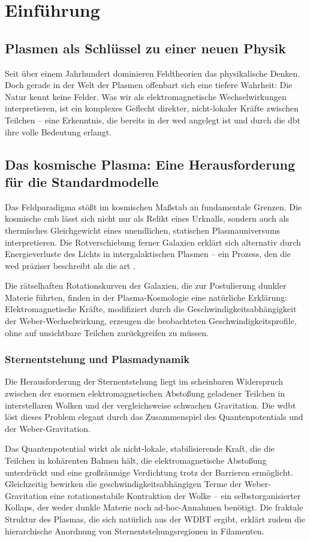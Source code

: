 \chapter{Einführung}
\section{Plasmen als Schlüssel zu einer neuen Physik}
Seit über einem Jahrhundert dominieren Feldtheorien das physikalische Denken. Doch gerade in der Welt der Plasmen offenbart sich eine tiefere Wahrheit: Die Natur kennt keine Felder. Was wir als
elektromagnetische Wechselwirkungen interpretieren, ist ein komplexes Geflecht direkter, nicht-lokaler Kräfte zwischen Teilchen – eine Erkenntnis, die bereits in der \gls{wed} angelegt ist und durch
die \gls{dbt} ihre volle Bedeutung erlangt.

\section{Das kosmische Plasma: Eine Herausforderung für die Standardmodelle}
Das Feldparadigma stößt im kosmischen Maßstab an fundamentale Grenzen. Die kosmische \gls{cmb} lässt sich nicht nur als Relikt eines Urknalls, sondern auch als thermisches Gleichgewicht eines
unendlichen, statischen Plasmauniversums interpretieren. Die Rotverschiebung ferner Galaxien erklärt sich alternativ durch Energieverluste des Lichts in intergalaktischen Plasmen – ein Prozess,
den die \gls{wed} präziser beschreibt als die \gls{art} \cite{einstein1915}.

Die rätselhaften Rotationskurven der Galaxien, die zur Postulierung dunkler Materie führten, finden in der Plasma-Kosmologie eine natürliche Erklärung: Elektromagnetische Kräfte, modifiziert durch
die Geschwindigkeitsabhängigkeit der Weber-Wechselwirkung, erzeugen die beobachteten Geschwindigkeitsprofile, ohne auf unsichtbare Teilchen zurückgreifen zu müssen.

\subsection{Sternentstehung und Plasmadynamik}
Die Herausforderung der Sternentstehung liegt im scheinbaren Widerspruch zwischen der enormen elektromagnetischen Abstoßung geladener Teilchen in interstellaren Wolken und der vergleichsweise
schwachen Gravitation. Die \gls{wdbt} löst dieses Problem elegant durch das Zusammenspiel des Quantenpotentials und der Weber-Gravitation.

Das Quantenpotential wirkt als nicht-lokale, stabilisierende Kraft, die die Teilchen in kohärenten Bahnen hält, die elektromagnetische Abstoßung unterdrückt und eine großräumige Verdichtung trotz
der Barrieren ermöglicht. Gleichzeitig bewirken die geschwindigkeitsabhängigen Terme der Weber-Gravitation eine rotationsstabile Kontraktion der Wolke – ein selbstorganisierter Kollaps, der weder
dunkle Materie noch ad-hoc-Annahmen benötigt. Die fraktale Struktur des Plasmas, die sich natürlich aus der WDBT ergibt, erklärt zudem die hierarchische Anordnung von Sternentstehungsregionen in
Filamenten.


